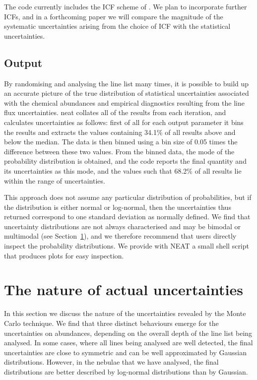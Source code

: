 \documentclass[useAMS,usenatbib]{mn2e}
\begin{document}
The code currently includes the ICF scheme of \citet{1994MNRAS.271..257K}.  We plan to incorporate further ICFs, and in a forthcoming paper we will compare the magnitude of the systematic uncertainties arising from the choice of ICF with the statistical uncertainties.

\subsection{Output}

By randomising and analysing the line list many times, it is possible to build up an accurate picture of the true distribution of statistical uncertainties associated with the chemical abundances and empirical diagnostics resulting from the line flux uncertainties. {\sc neat} collates all of the results from each iteration, and calculates uncertainties as follows: first of all for each output parameter it bins the results and extracts the values containing 34.1\% of all results above and below the median.  The data is then binned using a bin size of 0.05 times the difference between these two values.  From the binned data, the mode of the probability distribution is obtained, and the code reports the final quantity and its uncertainties as this mode, and the values such that 68.2\% of all results lie within the range of uncertainties.

This approach does not assume any particular distribution of probabilities, but if the distribution is either normal or log-normal, then the uncertainties thus returned correspond to one standard deviation as normally defined.  We find that uncertainty distributions are not always characterised and may be bimodal or multimodal (see Section~\ref{natureofuncertainties}), and we therefore recommend that users directly inspect the probability distributions.  We provide with {\sc NEAT} a small shell script that produces plots for easy inspection.

\section{The nature of actual uncertainties}
\label{natureofuncertainties}

In this section we discuss the nature of the uncertainties revealed by the Monte Carlo technique.  We find that three distinct behaviours emerge for the uncertainties on abundances, depending on the overall depth of the line list being analysed.  In some cases, where all lines being analysed are well detected, the final uncertainties are close to symmetric and can be well approximated by Gaussian distributions.  However, in the nebulae that we have analysed, the final distributions are better described by log-normal distributions than by Gaussian.
\end{document}
